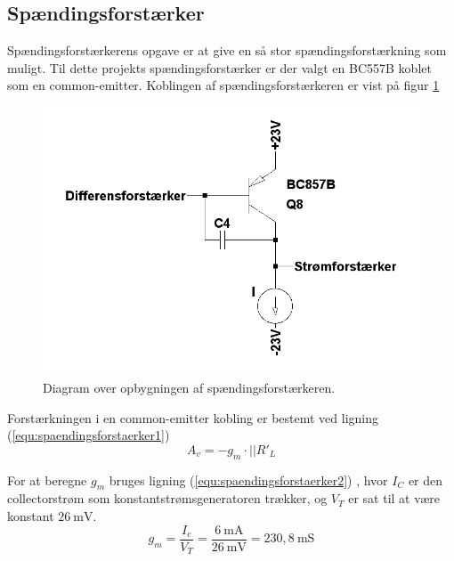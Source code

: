 \subsection{Spændingsforstærker}
\label{effekt_spaendingsforstaerker}
Spændingsforstærkerens opgave er at give en så stor spændingsforstærkning som muligt. Til dette projekts spændingsforstærker er der valgt en BC557B \cite{bc557b-datablad} %
koblet som en common-emitter. Koblingen af spændingsforstærkeren er vist på figur \ref{spaendingsforstaerker_diagram}

\begin{figure}[h]
\centering
\includegraphics[scale=0.3]{teknisk/effektforstaerker/spaendingsforstaerker_diagram.png}
\caption{Diagram over opbygningen af spændingsforstærkeren.}
\label{spaendingsforstaerker_diagram}
\end{figure}

Forstærkningen i en common-emitter kobling er bestemt ved ligning (\ref{equ:spaendingsforstaerker1}) \cite{ael-mm7}%
\begin{equation}
\label{equ:spaendingsforstaerker1}
A_v = -g_m \cdot || R'_L
\end{equation}

For at beregne $g_m$ bruges ligning (\ref{equ:spaendingsforstaerker2}) \cite{ael-mm5}%
, hvor $I_C$ er den collectorstrøm som konstantstrømsgeneratoren trækker, og $V_T$ er sat til at være konstant $26~\mathrm{mV}$.
\begin{equation}
\label{equ:spaendingsforstaerker2}
g_m = \frac{I_c}{V_T} = \frac{6~\mathrm{mA}}{26~\mathrm{mV}} = 230,8~\mathrm{mS}
\end{equation}

